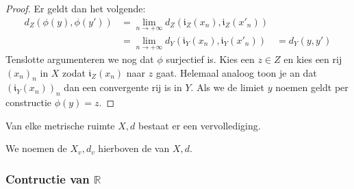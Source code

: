 \documentclass[main.tex]{subfiles}
\begin{document}
\begin{bst}
\begin{proof}
    Er geldt dan het volgende:
    \begin{align*}
      d_{Z}(\phi(y),\phi(y'))
      &= \lim_{n\rightarrow +\infty}d_{Z}(\mathfrak{i}_{Z}(x_{n}),\mathfrak{i}_{Z}(x'_{n}))\\
      &= \lim_{n\rightarrow +\infty}d_{Y}(\mathfrak{i}_{Y}(x_{n}),\mathfrak{i}_{Y}(x'_{n}))
      &= d_{Y}(y,y')
    \end{align*}
    Tenslotte argumenteren we nog dat $\phi$ surjectief is.
    Kies een $z\in Z$ en kies een rij $(x_{n})_{n}$ in $X$ zodat $\mathfrak{i}_{Z}(x_{n})$ naar $z$ gaat.
    Helemaal analoog toon je an dat $(\mathfrak{i}_{Y}(x_{n}))_{n}$ dan een convergente rij is in $Y$.
    Als we de limiet $y$ noemen geldt per constructie $\phi(y) = z$.
  \end{proof}
\end{bst}

\begin{bst}
  Van elke metrische ruimte $X,d$ bestaat er een vervollediging.
\end{bst}

\begin{de}
  We noemen de $X_{v},d_{v}$ hierboven de  van $X,d$.
\end{de}

\subsubsection{Contructie van $\mathbb{R}$}
\label{sec:contr-van-mathbbr}

\end{document}
